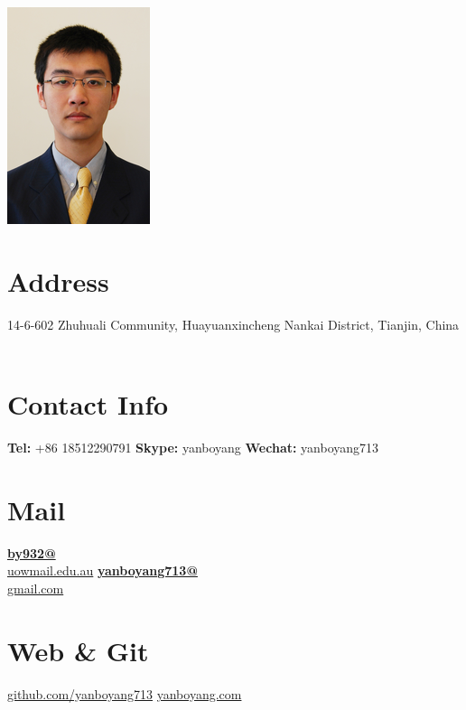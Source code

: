 \documentclass[]{friggeri-cv}
\begin{document}
     

\begin{aside}
  \includegraphics[scale=0.07]{img/boyang.png}
  \section{Address}
  14-6-602 Zhuhuali Community, Huayuanxincheng
  Nankai District,  Tianjin,
  China
    ~
  \section{Contact Info}
  \textbf{Tel:} +86 18512290791
    \textbf{Skype:} yanboyang
    \textbf{Wechat:} yanboyang713
    ~
  \section{Mail}
    \href{mailto:by932@uowmail.edu.au}{\textbf{by932@}\\uowmail.edu.au}
    \href{mailto:yanboyang713@gmail.com}{\textbf{yanboyang713@}\\gmail.com}
    ~
  \section{Web \& Git}
    \href{https://github.com/yanboyang713}{github.com/yanboyang713}
    \href{http://www.yanboyang.com}{yanboyang.com}
    ~

\end{aside}
\end{document}
